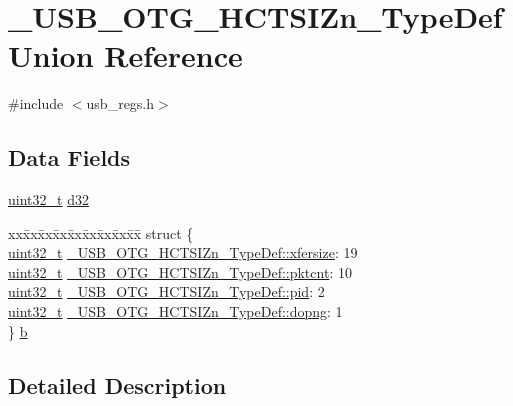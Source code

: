 \hypertarget{union___u_s_b___o_t_g___h_c_t_s_i_zn___type_def}{\section{\-\_\-\-U\-S\-B\-\_\-\-O\-T\-G\-\_\-\-H\-C\-T\-S\-I\-Zn\-\_\-\-Type\-Def Union Reference}
\label{union___u_s_b___o_t_g___h_c_t_s_i_zn___type_def}
}


{\ttfamily \#include $<$usb\-\_\-regs.\-h$>$}

\subsection*{Data Fields}
\begin{DoxyCompactItemize}
\item 
\hyperlink{stdint_8h_a435d1572bf3f880d55459d9805097f62}{uint32\-\_\-t} \hyperlink{group___u_s_b___o_t_g___d_r_i_v_e_r_ga80c3cf6f0e0af82913acdd14390822f6}{d32}
\item 
\begin{tabbing}
xx\=xx\=xx\=xx\=xx\=xx\=xx\=xx\=xx\=\kill
struct \{\\
\>\hyperlink{stdint_8h_a435d1572bf3f880d55459d9805097f62}{uint32\_t} \hyperlink{group___u_s_b___o_t_g___d_r_i_v_e_r_ga3ad5a80edb18c6fc8ebe2a9979caac3d}{\_USB\_OTG\_HCTSIZn\_TypeDef::xfersize}: 19\\
\>\hyperlink{stdint_8h_a435d1572bf3f880d55459d9805097f62}{uint32\_t} \hyperlink{group___u_s_b___o_t_g___d_r_i_v_e_r_ga053e63325d6dfa002f2efd2468957465}{\_USB\_OTG\_HCTSIZn\_TypeDef::pktcnt}: 10\\
\>\hyperlink{stdint_8h_a435d1572bf3f880d55459d9805097f62}{uint32\_t} \hyperlink{group___u_s_b___o_t_g___d_r_i_v_e_r_gaf18e11b9b2811283695800e8afef88a2}{\_USB\_OTG\_HCTSIZn\_TypeDef::pid}: 2\\
\>\hyperlink{stdint_8h_a435d1572bf3f880d55459d9805097f62}{uint32\_t} \hyperlink{group___u_s_b___o_t_g___d_r_i_v_e_r_gafa9fe50afa481ae6a656a4c752827a7e}{\_USB\_OTG\_HCTSIZn\_TypeDef::dopng}: 1\\
\} \hyperlink{group___u_s_b___o_t_g___d_r_i_v_e_r_gacabd75f98a799b56f9fb7c935296b8aa}{b}\\

\end{tabbing}\end{DoxyCompactItemize}


\subsection{Detailed Description}


